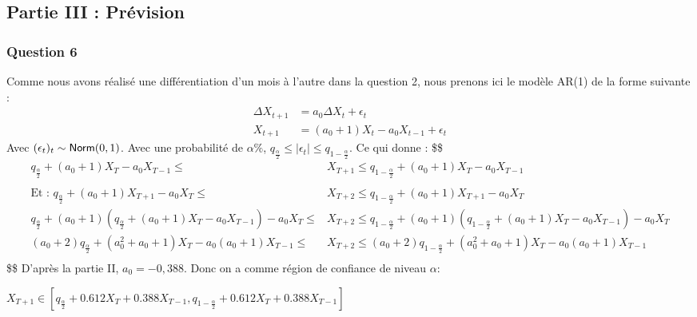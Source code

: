 \documentclass[
  landscape]{article}
\begin{document}
\hypertarget{partie-iii-pruxe9vision}{%
\subsection{Partie III : Prévision}\label{partie-iii-pruxe9vision}}

\hypertarget{question-6}{%
\subsubsection{Question 6}\label{question-6}}

Comme nous avons réalisé une différentiation d'un mois à l'autre dans la
question 2, nous prenons ici le modèle AR(1) de la forme suivante : \[
\begin{align*}
\Delta X_{t+1} &= a_{0} \Delta X_{t} + \epsilon_{t} \\
X_{t+1} &= (a_{0}+1)X_{t} - a_{0}X_{t-1} + \epsilon_{t}
\end{align*}
\] Avec \((\epsilon_{t})_{t} \sim {\sf Norm}(0,1)\). Avec une
probabilité de \(\alpha\%\),
\(q_{\frac{\alpha}{2}} \leq \mid\epsilon_{t}\mid \leq q_{1-\frac{\alpha}{2}}\).
Ce qui donne : \$\$ \begin{align*}
q_{\frac{\alpha}{2}} + (a_{0}+1)X_{T} - a_{0}X_{T-1} \leq &X_{T+1} \leq q_{1-\frac{\alpha}{2}} + (a_{0}+1)X_{T} - a_{0}X_{T-1} \\ \\

\text{Et : } q_{\frac{\alpha}{2}} + (a_{0}+1)X_{T+1} - a_{0}X_{T} \leq &X_{T+2} \leq q_{1-\frac{\alpha}{2}} + (a_{0}+1)X_{T+1} - a_{0}X_{T} \\

q_{\frac{\alpha}{2}} + (a_{0}+1)(q_{\frac{\alpha}{2}} + (a_{0}+1)X_{T} - a_{0}X_{T-1}) - a_{0}X_{T} \leq &X_{T+2} \leq q_{1-\frac{\alpha}{2}} + (a_{0}+1)(q_{1-\frac{\alpha}{2}} + (a_{0}+1)X_{T} - a_{0}X_{T-1}) - a_{0}X_{T} \\

(a_{0}+2)q_{\frac{\alpha}{2}} + (a_{0}^2+a_{0}+1)X_{T} - a_{0}(a_{0}+1)X_{T-1} \leq &X_{T+2} \leq (a_{0}+2)q_{1-\frac{\alpha}{2}} + (a_{0}^2+a_{0}+1)X_{T} - a_{0}(a_{0}+1)X_{T-1} \\

\end{align*} \$\$ D'après la partie II, \(a_{0} = -0,388\). Donc on a
comme région de confiance de niveau \(\alpha\):

\(X_{T+1} \in \left[q_{\frac{\alpha}{2}} + 0.612X_{T} + 0.388X_{T-1}, q_{1-\frac{\alpha}{2}} + 0.612X_{T} + 0.388X_{T-1}\right]\)
\end{document}
